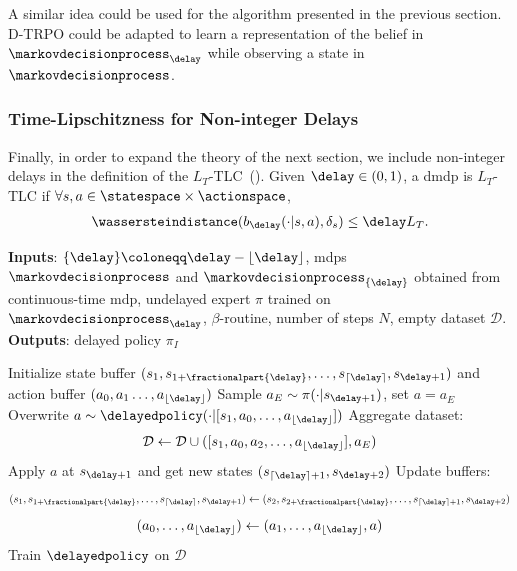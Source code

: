 \begin{remark}
    A similar idea could be used for the algorithm presented in the previous section.
    D-TRPO could be adapted to learn a representation of the belief in $\markovdecisionprocess_\delay$ while observing a state in $\markovdecisionprocess$.
\end{remark}


\subsubsection{Time-Lipschitzness for Non-integer Delays}
Finally, in order to expand the theory of the next section, we include non-integer delays in the definition of the $L_T$-TLC~(). Given $\delay\in(0,1)$, a \gls{dmdp} is $L_T$-TLC if $\forall s,a\in \statespace\times\actionspace$,
\begin{align}
\label{eq:time_lip_non_int}
    \wassersteindistance(b_\delay(\cdot\vert s,a), \delta_s)\le \delay L_T.
\end{align}




\begin{algorithm}[t] 
\caption{DIDA for non-integer delays ($\delay\in\realnumbers[\ge0]$)}\label{algo:dida_non_int}
\textbf{Inputs}:
$\{\delay\}\coloneqq\delay-\lfloor\delay\rfloor$, \glspl{mdp} $\markovdecisionprocess$ and $\markovdecisionprocess_{\{\delay\}}$ obtained from continuous-time \gls{mdp}, undelayed expert $\pi$ trained on $\markovdecisionprocess_{\delay}$, $\beta$-routine, number of steps $N$, empty dataset $\mathcal{D}$.\\
\textbf{Outputs}: delayed policy $\pi_I$
\begin{algorithmic}[1]
                \STATE Initialize state buffer $( s_{1},s_{1+\fractionalpart{\delay}}, \dots, s_{\lceil\delay\rceil},s_{\delay+1})$ and action buffer $( a_{0},a_{1} \dots, a_{\lfloor\delay\rfloor})$
            \ENDIF
            \STATE Sample $a_E\sim\pi(\cdot\vert {{s}}_{\delay+1})$, set $a=a_E$
                \STATE Overwrite ${ a \sim\delayedpolicy(\cdot\vert [{s}_{1},a_{0}, \dots, a_{\lfloor\delay\rfloor}])}$ 
            \ENDIF
            \STATE Aggregate dataset:
            $$\mathcal{D}\leftarrow \mathcal{D} \cup ([{s}_{1}, a_{0},a_2, \dots, a_{\lfloor\delay\rfloor}],a_E)$$
            \STATE Apply $a$ at $s_{\delay+1}$ and get new states $(s_{\lceil\delay\rceil+1},s_{\delay+2})$
            \STATE Update buffers:
            $$(s_{1}, s_{1+\fractionalpart{\delay}}, \dots, s_{\lceil\delay\rceil},s_{\delay+1}) \leftarrow ( s_{2},s_{2+\fractionalpart{\delay}}, \dots, s_{\lceil\delay\rceil+1},s_{\delay+2})$$
            $$({a}_0,\dots, a_{\lfloor\delay\rfloor}) \leftarrow ({a}_1,\dots,a_{\lfloor\delay\rfloor},a)$$
            \ENDFOR
        \STATE Train $\delayedpolicy$ on $\mathcal{D}$ 
    \ENDFOR
\end{algorithmic}
\end{algorithm} 




